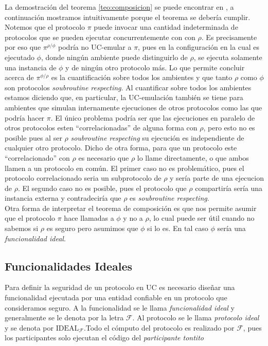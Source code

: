 La demostración del teorema \ref{teo:composicion} se puede encontrar en \cite{UC:completo}, a continuación
mostramos intuitivamente porque el teorema se debería cumplir.\\
Notemos que el protocolo $\pi$ puede invocar una cantidad indeterminada de protocolos
que se pueden ejecutar concurrentemente
con con $\rho$. Es precisamente por eso que $\pi^{\rho/\phi}$ podría no UC-emular a $\pi$, pues en la configuración
en la cual es ejecutado $\phi$, donde ningún ambiente puede distinguirlo de $\rho$, se ejecuta solamente una
instancia de $\phi$ y de ningún otro protocolo más. Lo que permite concluir acerca de $\pi^{\phi/\rho}$ es la
cuantificación sobre todos los ambientes y que tanto $\rho$ como $\phi$ son protocolos \textit{soubroutine
respecting}. Al cuantificar sobre todos los ambientes estamos diciendo que, en particular, la UC-emulación
también se tiene para ambientes que simulan internamente ejecuciones de otros protocolos como las que podría
hacer $\pi$. El único problema podría ser que las ejecuciones en paralelo de otros protocolos esten
``correlacionadas'' de alguna forma con $\rho$, pero esto no es posible pues al ser $\rho$ \textit{soubroutine respecting}
su ejecución es independiente de cualquier otro protocolo. Dicho de otra forma, para que un protocolo
este ``correlacionado'' con $\rho$ es necesario que $\rho$ lo llame directamente, o que ambos llamen a un protocolo
en común. El primer caso no es problemático, pues el protocolo correlacionado seria un subprotocolo de $\rho$
y sería parte de una ejecucion de $\rho$. El segundo caso no es posible, pues el protocolo que $\rho$ compartiría
sería una instancia externa y contradeciría que $\rho$ es \textit{soubroutine respecting}.\\

Otra forma de interpretar el teorema de composición es que nos permite asumir que el protocolo $\pi$ hace llamadas
a $\phi$ y no a $\rho$, lo cual puede ser útil cuando no sabemos si $\rho$ es seguro pero asumimos que $\phi$
si lo es. En tal caso $\phi$ sería una \textit{funcionalidad ideal}.

\subsection{Funcionalidades Ideales}
Para definir la seguridad de un protocolo en UC es necesario diseñar una funcionalidad ejecutada por una entidad
confiable en un protocolo que consideramos seguro. A la funcionalidad se le llama \textit{funcionalidad ideal} y
generalmente se le denota por la letra $\mathcal{F}$. Al protocolo se le llama \textit{protocolo ideal} y se
denota por $\mathrm{IDEAL}_\mathcal{F}$.Todo el cómputo del protocolo es realizado por $\mathcal{F}$, pues
los participantes solo ejecutan el código del \textit{participante tontito}

